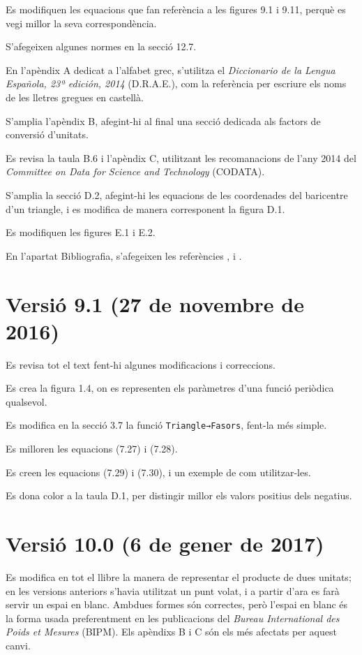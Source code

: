 Es modifiquen les equacions que fan referència a les figures 9.1 i 9.11, perquè es vegi millor la seva correspondència.

S'afegeixen algunes normes en la secció 12.7.

En l'apèndix A dedicat a l'alfabet grec, s'utilitza el  
\textit{Diccionario de la Lengua Española, 23ª
edición, 2014} (D.R.A.E.), com la referència per escriure els noms de les lletres gregues en castellà.

S'amplia l'apèndix B, afegint-hi al final una secció dedicada als factors de conversió d'unitats.

Es revisa la taula B.6 i l'apèndix C, utilitzant les recomanacions de l'any 2014 del \textit{Committee on Data for Science and Technology} (CODATA).


S'amplia la secció D.2, afegint-hi les equacions de les coordenades del baricentre d'un triangle, i es modifica de manera corresponent la figura D.1.

Es modifiquen les figures E.1 i E.2.

En l'apartat Bibliografia, s'afegeixen les referències \cite{VOS}, \cite{WMF} i \cite{TRA}.


\section*{Versió 9.1 (27 de novembre de 2016)}

Es revisa tot el text fent-hi algunes  modificacions i correccions.

Es crea la figura 1.4, on es representen els paràmetres d'una funció periòdica qualsevol.

Es modifica en la secció 3.7 la funció \texttt{Triangle→Fasors}, fent-la més simple.

Es milloren les equacions (7.27) i (7.28).

Es creen les equacions (7.29) i (7.30), i un exemple de com utilitzar-les.

Es dona color a la taula D.1, per  distingir millor els valors positius dels negatius.

\section*{Versió 10.0 (6 de gener de 2017)}

Es modifica en tot el llibre la manera de representar el producte de dues unitats; en les versions anteriors s'havia utilitzat un punt volat, i a partir d'ara es farà servir un espai en blanc. Ambdues formes són correctes, però l'espai en blanc és la forma usada preferentment en les publicacions del  \textit{Bureau International des Poids et Mesures} (BIPM). Els apèndixs B i C són els més afectats per aquest canvi.

